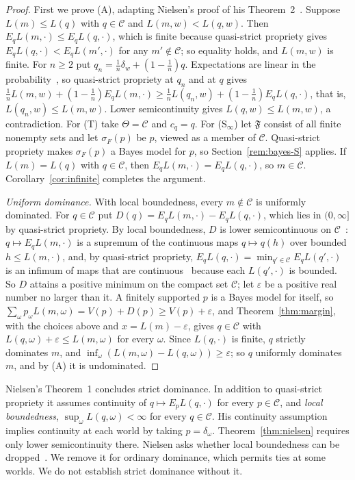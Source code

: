 \documentclass[11pt]{article}
\theoremstyle{definition}
\theoremstyle{remark}
\newcommand{\C}{\mathcal C}
\newcommand{\F}{\mathfrak F}
\begin{document}
\begin{proof}


First we prove (A), adapting Nielsen's proof of his Theorem~2~\cite{Nielsen}. Suppose $L(m)\le L(q)$ with $q\in\C$ and $L(m,w)<L(q,w)$. Then $E_qL(m,\cdot)\le E_qL(q,\cdot)$, which is finite because quasi-strict propriety gives $E_qL(q,\cdot)<E_qL(m',\cdot)$ for any $m'\notin\C$; so equality holds, and $L(m,w)$ is finite. For $n\ge2$ put $q_n=\frac1n\delta_w+(1-\frac1n)q$. Expectations are linear in the probability~\cite[Appendix~A, Proposition~1]{Nielsen}, so quasi-strict propriety at $q_n$ and at $q$ gives $\frac1nL(m,w)+(1-\frac1n)E_qL(m,\cdot)\ge\frac1nL(q_n,w)+(1-\frac1n)E_qL(q,\cdot)$, that is, $L(q_n,w)\le L(m,w)$. Lower semicontinuity gives $L(q,w)\le L(m,w)$, a contradiction. For (T) take $\Theta=\C$ and $c_q=q$. For (S$_\infty$) let $\F$ consist of all finite nonempty sets and let $\sigma_F(p)$ be $p$, viewed as a member of $\C$. Quasi-strict propriety makes $\sigma_F(p)$ a Bayes model for $p$, so Section~\ref{rem:bayes-S} applies. If $L(m)=L(q)$ with $q\in\C$, then $E_qL(m,\cdot)=E_qL(q,\cdot)$, so $m\in\C$. Corollary~\ref{cor:infinite} completes the argument.

\emph{Uniform dominance.} With local boundedness, every $m\notin\C$ is uniformly dominated. For $q\in\C$ put $D(q)=E_qL(m,\cdot)-E_qL(q,\cdot)$, which lies in $(0,\infty]$ by quasi-strict propriety. By local boundedness, $D$ is lower semicontinuous on $\C$~\cite[Lemma~3]{Nielsen}: $q\mapsto E_qL(m,\cdot)$ is a supremum of the continuous maps $q\mapsto q(h)$ over bounded $h\le L(m,\cdot)$, and, by quasi-strict propriety, $E_qL(q,\cdot)=\min_{q'\in\C}E_qL(q',\cdot)$ is an infimum of maps that are continuous~\cite[Lemma~1]{Nielsen} because each $L(q',\cdot)$ is bounded. So $D$ attains a positive minimum on the compact set $\C$; let $\varepsilon$ be a positive real number no larger than it. A finitely supported $p$ is a Bayes model for itself, so $\sum_\omega p_\omega L(m,\omega)=V(p)+D(p)\ge V(p)+\varepsilon$, and Theorem~\ref{thm:margin}, with the choices above and $x=L(m)-\varepsilon$, gives $q\in\C$ with $L(q,\omega)+\varepsilon\le L(m,\omega)$ for every $\omega$. Since $L(q,\cdot)$ is finite, $q$ strictly dominates $m$, and $\inf_\omega(L(m,\omega)-L(q,\omega))\ge\varepsilon$; so $q$ uniformly dominates $m$, and by (A) it is undominated.
\end{proof}

Nielsen's Theorem~1 concludes strict dominance. In addition to quasi-strict propriety it assumes continuity of $q\mapsto E_pL(q,\cdot)$ for every $p\in\C$, and \emph{local boundedness}, $\sup_\omega L(q,\omega)<\infty$ for every $q\in\C$. His continuity assumption implies continuity at each world by taking $p=\delta_\omega$. Theorem~\ref{thm:nielsen} requires only lower semicontinuity there. Nielsen asks whether local boundedness can be dropped~\cite[\S4.2.1]{Nielsen}. We remove it for ordinary dominance, which permits ties at some worlds. We do not establish strict dominance without it.
\end{document}
